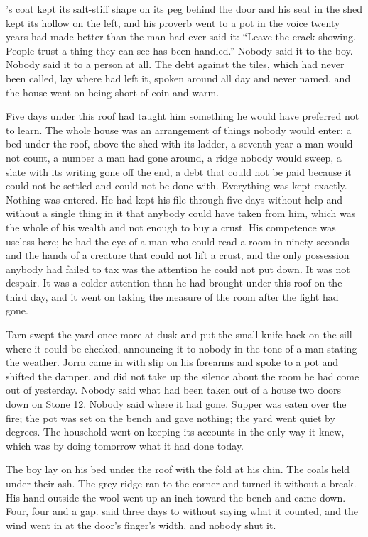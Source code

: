 's coat kept its salt-stiff shape on its peg behind the door and his seat in the shed kept its hollow on the left, and his proverb went to a pot in the voice twenty years had made better than the man had ever said it: “Leave the crack showing. People trust a thing they can see has been handled.” Nobody said it to the boy. Nobody said it to a person at all. The debt against the tiles, which had never been called, lay where  had left it, spoken around all day and never named, and the house went on being short of coin and warm.

Five days under this roof had taught him something he would have preferred not to learn. The whole house was an arrangement of things nobody would enter: a bed under the roof,  above the shed with its ladder, a seventh year a man would not count, a number a man had gone around, a ridge nobody would sweep, a slate with its writing gone off the end, a debt that could not be paid because it could not be settled and could not be done with. Everything was kept exactly. Nothing was entered. He had kept his file through five days without help and without a single thing in it that anybody could have taken from him, which was the whole of his wealth and not enough to buy a crust. His competence was useless here; he had the eye of a man who could read a room in ninety seconds and the hands of a creature that could not lift a crust, and the only possession anybody had failed to tax was the attention he could not put down. It was not despair. It was a colder attention than he had brought under this roof on the third day, and it went on taking the measure of the room after the light had gone.

Tarn swept the yard once more at dusk and put the small knife back on the sill where it could be checked, announcing it to nobody in the tone of a man stating the weather. Jorra came in with slip on his forearms and spoke to a pot and shifted the damper, and did not take up the silence about the room he had come out of yesterday. Nobody said what had been taken out of a house two doors down on Stone 12. Nobody said where it had gone. Supper was eaten over the fire; the pot was set on the bench and gave nothing; the yard went quiet by degrees. The household went on keeping its accounts in the only way it knew, which was by doing tomorrow what it had done today.

The boy lay on his bed under the roof with the fold at his chin. The coals held under their ash. The grey ridge ran to the corner and turned it without a break. His hand outside the wool went up an inch toward the bench and came down. Four, four and a gap.  said three days to  without saying what it counted, and the wind went in at the door's finger's width, and nobody shut it.
